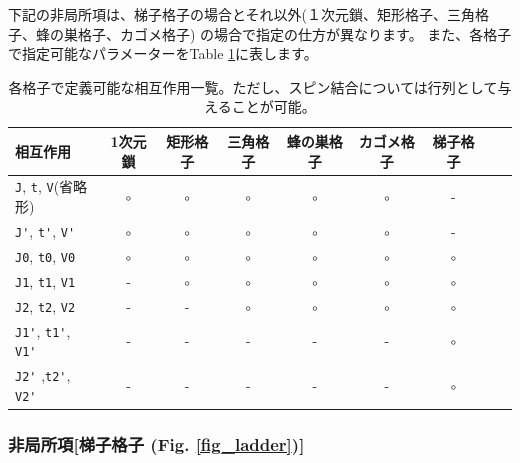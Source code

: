 下記の非局所項は、梯子格子の場合とそれ以外(１次元鎖、矩形格子、三角格子、蜂の巣格子、カゴメ格子)
の場合で指定の仕方が異なります。
また、各格子で指定可能なパラメーターをTable \ref{table_interactions}に表します。

\begin{table}[hbp]
  \begin{tabular}{|l||c|c|c|c|c|c|c|c|} \hline
    相互作用 & 1次元鎖 & 矩形格子 & 三角格子 & 蜂の巣格子 & カゴメ格子 & 梯子格子\\ 
    \hline \hline
     \verb|J|, \verb|t|, \verb|V|(省略形) & $\circ$	 & $\circ$ & $\circ$ & $\circ$ & $\circ$ & -\\ 
     \hline
    \verb|J'|, \verb|t'|, \verb|V'| & $\circ$	 & $\circ$	& $\circ$ 	& $\circ$ 	& $\circ$ & - \\ 
    \hline
    \verb|J0|, \verb|t0|, \verb|V0| & $\circ$  & $\circ$ 	& $\circ$ 	& $\circ$ 	& $\circ$ & $\circ$\\ 
    \hline
    \verb|J1|, \verb|t1|, \verb|V1| & -         	 & $\circ$ 	& $\circ$ 	& $\circ$ 	& $\circ$ & $\circ$\\ 
    \hline
    \verb|J2|, \verb|t2|, \verb|V2|  & -         	 & -    	& $\circ$ 	& $\circ$ 	& $\circ$ & $\circ$\\
    \hline
    \verb|J1'|, \verb|t1'|, \verb|V1'| & -		 &-	 	& -		& -		& -		& $\circ$\\
    \hline
    \verb|J2'| ,\verb|t2'|, \verb|V2'|  & -		 &-	 	& -		& -		& -		& $\circ$\\ 
    \hline
\end{tabular}
   \caption{各格子で定義可能な相互作用一覧。ただし、スピン結合については行列として与えることが可能。}
    \label{table_interactions}
\end{table}

\subsubsection{非局所項[梯子格子 (Fig. \ref{fig_ladder})]}

